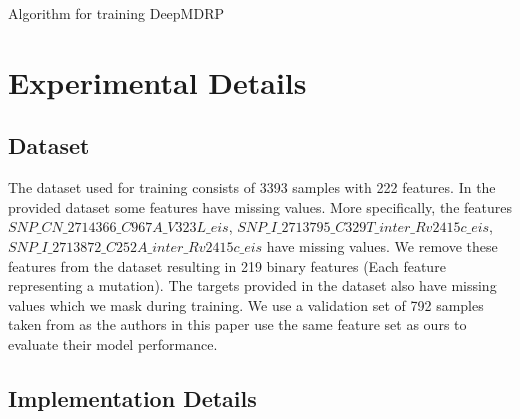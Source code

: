 \documentclass{article}
\begin{document}
\begin{algorithm}[H]
    \SetAlgoLined
     \BlankLine
    \caption{Algorithm for training DeepMDRP}
    \label{algo:train}
\end{algorithm}

\section{Experimental Details}

\subsection{Dataset}
The dataset used for training consists of 3393 samples with 222 features. In the provided dataset some features
have missing values. More specifically, the features $SNP\_CN\_2714366\_C967A\_V323L\_eis$,
$SNP\_I\_2713795\_C329T\_inter\_Rv2415c\_eis$, $SNP\_I\_2713872\_C252A\_inter\_Rv2415c\_eis$ have missing values.
We remove these features from the dataset resulting in 219 binary features (Each feature representing
a mutation). The targets provided in the dataset also have missing values which we mask during training. We use
a validation set of 792 samples taken from \cite{CHEN2019356} as the authors in this paper use the same feature set as ours
to evaluate their model performance.

\subsection{Implementation Details}
\label{section:hyper}
\end{document}
